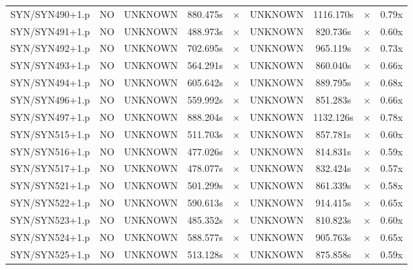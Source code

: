 \documentclass[a4paper,10pt]{article}
\begin{document}
\begin{longtable}{lcccccccc}
SYN/SYN490+1.p & NO & UNKNOWN & 880.475s & \cellcolor{mismatchcolor}$\times$ & UNKNOWN & 1116.170s & \cellcolor{mismatchcolor}$\times$ & 0.79x \\
SYN/SYN491+1.p & NO & UNKNOWN & 488.973s & \cellcolor{mismatchcolor}$\times$ & UNKNOWN & 820.736s & \cellcolor{mismatchcolor}$\times$ & 0.60x \\
SYN/SYN492+1.p & NO & UNKNOWN & 702.695s & \cellcolor{mismatchcolor}$\times$ & UNKNOWN & 965.119s & \cellcolor{mismatchcolor}$\times$ & 0.73x \\
SYN/SYN493+1.p & NO & UNKNOWN & 564.291s & \cellcolor{mismatchcolor}$\times$ & UNKNOWN & 860.040s & \cellcolor{mismatchcolor}$\times$ & 0.66x \\
SYN/SYN494+1.p & NO & UNKNOWN & 605.642s & \cellcolor{mismatchcolor}$\times$ & UNKNOWN & 889.795s & \cellcolor{mismatchcolor}$\times$ & 0.68x \\
SYN/SYN496+1.p & NO & UNKNOWN & 559.992s & \cellcolor{mismatchcolor}$\times$ & UNKNOWN & 851.283s & \cellcolor{mismatchcolor}$\times$ & 0.66x \\
SYN/SYN497+1.p & NO & UNKNOWN & 888.204s & \cellcolor{mismatchcolor}$\times$ & UNKNOWN & 1132.126s & \cellcolor{mismatchcolor}$\times$ & 0.78x \\
SYN/SYN515+1.p & NO & UNKNOWN & 511.703s & \cellcolor{mismatchcolor}$\times$ & UNKNOWN & 857.781s & \cellcolor{mismatchcolor}$\times$ & 0.60x \\
SYN/SYN516+1.p & NO & UNKNOWN & 477.026s & \cellcolor{mismatchcolor}$\times$ & UNKNOWN & 814.831s & \cellcolor{mismatchcolor}$\times$ & 0.59x \\
SYN/SYN517+1.p & NO & UNKNOWN & 478.077s & \cellcolor{mismatchcolor}$\times$ & UNKNOWN & 832.424s & \cellcolor{mismatchcolor}$\times$ & 0.57x \\
SYN/SYN521+1.p & NO & UNKNOWN & 501.299s & \cellcolor{mismatchcolor}$\times$ & UNKNOWN & 861.339s & \cellcolor{mismatchcolor}$\times$ & 0.58x \\
SYN/SYN522+1.p & NO & UNKNOWN & 590.613s & \cellcolor{mismatchcolor}$\times$ & UNKNOWN & 914.415s & \cellcolor{mismatchcolor}$\times$ & 0.65x \\
SYN/SYN523+1.p & NO & UNKNOWN & 485.352s & \cellcolor{mismatchcolor}$\times$ & UNKNOWN & 810.823s & \cellcolor{mismatchcolor}$\times$ & 0.60x \\
SYN/SYN524+1.p & NO & UNKNOWN & 588.577s & \cellcolor{mismatchcolor}$\times$ & UNKNOWN & 905.763s & \cellcolor{mismatchcolor}$\times$ & 0.65x \\
SYN/SYN525+1.p & NO & UNKNOWN & 513.128s & \cellcolor{mismatchcolor}$\times$ & UNKNOWN & 875.858s & \cellcolor{mismatchcolor}$\times$ & 0.59x \\

\end{longtable}
\end{document}
